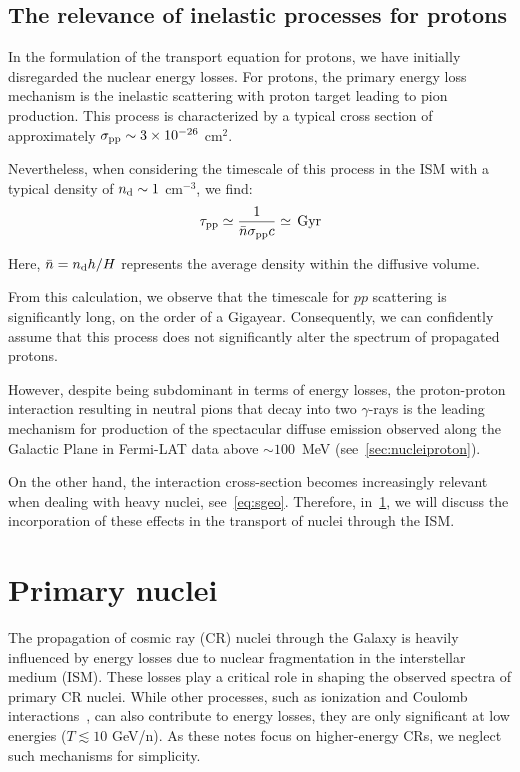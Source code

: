 \subsection{The relevance of inelastic processes for protons}

In the formulation of the transport equation for protons, we have initially disregarded the nuclear energy losses. For protons, the primary energy loss mechanism is the inelastic scattering with proton target leading to pion production. This process is characterized by a typical cross section of approximately $\sigma_{\rm pp}\sim 3\times 10^{-26}$ cm$^2$.

Nevertheless, when considering the timescale of this process in the ISM with a typical density of $n_{\rm d} \sim 1$ cm$^{-3}$, we find:
%
\begin{equation}
\tau_{\rm pp} \simeq \frac{1}{\bar{n}\sigma_{\rm pp}c} \simeq \, \text{Gyr}
\end{equation}

Here, $\bar{n} = n_{\rm d} h/H$ represents the average density within the diffusive volume.

From this calculation, we observe that the timescale for $pp$ scattering is significantly long, on the order of a Gigayear. Consequently, we can confidently assume that this process does not significantly alter the spectrum of propagated protons. 

However, despite being subdominant in terms of energy losses, the proton-proton interaction resulting in neutral pions that decay into two $\gamma$-rays is the leading mechanism for production of the spectacular diffuse emission observed along the Galactic Plane in Fermi-LAT data above $\sim 100$~MeV (see~\ref{sec:nucleiproton}).

On the other hand, the interaction cross-section becomes increasingly relevant when dealing with heavy nuclei, see~\ref{eq:sgeo}. Therefore, in~\ref{sec:nuclei}, we will discuss the incorporation of these effects in the transport of nuclei through the ISM.

\section{Primary nuclei}
\label{sec:nuclei}  

The propagation of cosmic ray (CR) nuclei through the Galaxy is heavily influenced by energy losses due to nuclear fragmentation in the interstellar medium (ISM). These losses play a critical role in shaping the observed spectra of primary CR nuclei. While other processes, such as ionization and Coulomb interactions~\cite{Serpicolecture}, can also contribute to energy losses, they are only significant at low energies (\(T \lesssim 10\) GeV/n). As these notes focus on higher-energy CRs, we neglect such mechanisms for simplicity.

